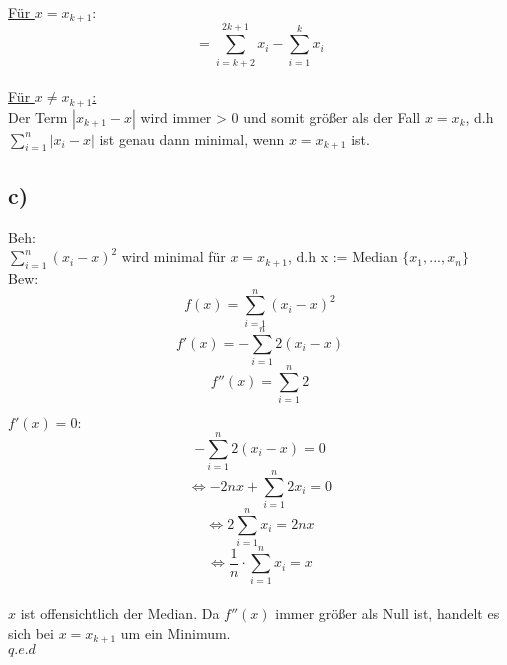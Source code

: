 \documentclass[a4paper,11pt,twoside]{article}
\begin{document}
\underline{Für $x=x_{k+1}$}:
\[= \sum_{i=k+2}^{2k+1}x_i - \sum_{i=1}^{k}x_i \] \\

\underline{Für $x \neq x_{k+1}$:}\\
Der Term  $|x_{k+1}-x|$ wird immer > 0 und somit größer als der Fall $x=x_k$, d.h  $\sum_{i=1}^{n} |x_i-x|$ ist genau dann minimal, wenn $x = x_{k+1}$ ist.

\subsection*{c)}

Beh:\\ $\sum_{i=1}^{n} (x_i-x)^2$ wird minimal für $x = x_{k+1}$, d.h x := Median $\{x_1, ..., x_n\}$\\

Bew: \\
\[f(x) = \sum_{i=1}^{n} (x_i -x)^2\]
\[f'(x) = -\sum_{i=1}^{n} 2(x_i -x)\]
\[f''(x) = \sum_{i=1}^{n} 2\]

\underline{$f'(x)=0:$}\\
\[-\sum_{i=1}^{n}2(x_i -x) = 0\]
\[\Leftrightarrow -2nx + \sum_{i=1}^{n}2x_i = 0\]
\[\Leftrightarrow 2\sum_{i=1}^{n}x_i = 2nx\]
\[\Leftrightarrow \frac{1}{n} \cdot \sum_{i=1}^{n}x_i = x\]\\

$x$ ist offensichtlich der Median. Da $f''(x)$ immer größer als Null ist, handelt es sich bei $x=x_{k+1}$ um ein Minimum.\\
$q.e.d$
\end{document}
